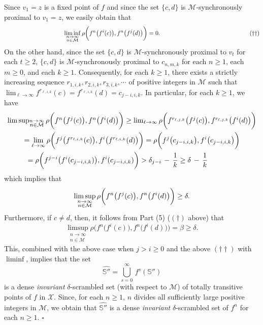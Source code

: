 \documentclass[12pt]{article}
\newcommand{\sq}{$\square$}
\begin{document}
Since $v_1 = z$ is a fixed point of $f$ and since the set $\{ c, d \}$ is $\mathcal M$-synchronously proximal to $v_1 = z$, we easily obtain that 
$$
\qquad\qquad\qquad\qquad\qquad \liminf_{\substack{n \to \infty \\ n \in \mathcal M}} \rho\bigg(f^n\big(f^i(c)\big), f^n\big(f^j(d)\big)\bigg) = 0. \qquad\qquad\qquad\qquad\qquad\qquad\qquad\,\,\,\,\,\, (\dagger\dagger) \vspace{.1in}
$$
\indent On the other hand, since the set $\{ c, d \}$ is $\mathcal M$-synchronously proximal to $v_t$ for each $t \ge 2$, $\{ c, d \}$ is $\mathcal M$-synchronously proximal to $c_{n,m,k}$ for each $n \ge 1$, each $m \ge 0$, and each $k \ge 1$.  Consequently, for each $k \ge 1$, there exists a strictly increasing sequence $r_{1,i,k}, r_{2,i,k}, r_{3,i,k}, \cdots$ of positive integers in $\mathcal M$ such that $\lim_{\ell \to \infty} f^{r_{\ell,i,k}}(c) = f^{r_{\ell,i,k}}(d) = c_{j-i, i,k}$.  In particular, for each $k \ge 1$, we have    
\begin{multline*}
$$
\limsup_{\substack{n \to \infty \\ n \in \mathcal M}} \rho\bigg(f^n\big(f^j(c)\big), f^n\big(f^i(d)\big)\bigg) \ge \lim_{\ell \to \infty} \rho\bigg(f^{r_{\ell,j,k}}\big(f^j(c)\big), f^{r_{\ell,j,k}}\big(f^i(d)\big)\bigg) \\
= \lim_{\ell \to \infty} \rho\bigg(f^j\big(f^{r_{\ell,i,k}}(c)\big), f^i\big(f^{r_{\ell,i,k}}(d)\big)\bigg)  
= \rho\bigg(f^j\big(c_{j-i,i,k}\big), f^i\big(c_{j-i,i,k}\big)\bigg) \\
= \rho\bigg(f^{j-i}\big(f^i(c_{j-i,i,k})\big), f^i(c_{j-i,i,k})\bigg) > \delta_{j-i} \, - \, \frac 1k \ge \delta \, - \, \frac 1k\qquad\qquad 
$$
\end{multline*}
which implies that 
$$
\limsup_{\substack{n \to \infty \\ n \in \mathcal M}} \rho\bigg(f^n\big(f^j(c)\big), f^n\big(f^i(d)\big)\bigg) \ge \delta.\vspace{.1in}
$$
\indent Furthermore, if $c \ne d$, then, it follows from Part (5) ($(\dagger)$ above) that 
$$
\limsup_{\substack{n \to \infty \\ n \in \mathcal M}} \rho\bigg(f^n\big(f^i(c)\big), f^n\big(f^i(d)\big)\bigg) = \beta \ge \delta.
$$
\indent This, combined with the above case when $j > i \ge 0$ and the above $(\dagger\dagger)$ with $\liminf$, implies that the set 
$$
\widehat {\mathbb S''} = \bigcup_{s=0}^\infty \, f^s(\mathbb S'')
$$
is a dense {\it invariant} $\delta$-scrambled set (with respect to $\mathcal M$) of totally transitive points of $f$ in $\mathcal X$.  Since, for each $n \ge 1$, $n$ divides all sufficiently large positive integers in $\mathcal M$, we obtain that $\widehat {\mathbb S''}$ is a dense {\it invariant} $\delta$-scrambled set of $f^n$ for each $n \ge 1$.  
\hfill\sq
\end{document}
